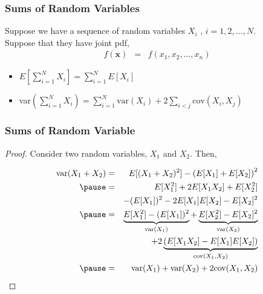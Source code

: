 \documentclass{beamer}
\numberwithin{equation}{section}
\begin{document}
\begin{frame}
\frametitle{Sums of Random Variables}

Suppose we have a sequence of random variables $X_{i}$ , $i = 1, 2, \hdots, N$.  \\

Suppose that they have joint pdf, 
\begin{eqnarray}
f(\boldsymbol{x}) & = & f(x_{1}, x_{2}, \hdots, x_{n}) \nonumber 
\end{eqnarray}

\begin{itemize}
\item[1)] $E[\sum_{i=1}^{N}X_{i} ]  = \sum_{i=1}^{N} E[X_{i}] $
\item[2)] var$(\sum_{i=1}^{N} X_{i} )   = \sum_{i=1}^{N} \text{var}(X_{i} )  + 2 \sum_{i<j} \text{cov}(X_{i}, X_{j}) $ 
\end{itemize}



\end{frame}


\begin{frame}
\frametitle{Sums of Random Variable}

\begin{proof}
Consider two random variables, $X_{1}$ and $X_{2}$.  Then, 

\pause 
\begin{eqnarray}
\text{var}(X_{1} + X_{2} ) & = & E[(X_{1} + X_{2})^2] - \left(E[X_{1}] + E[X_{2}] \right)^2 \nonumber \\  \pause 
& = & E[X_{1}^2]  + 2 E[X_{1}X_{2}]  + E[X_{2}^2]  \nonumber \\
&& - (E[X_{1}])^2 - 2 E[X_{1}] E[X_{2}]  -  E[X_{2}]^2 \nonumber \\ \pause 
& = & \underbrace{E[X_{1}^2] - (E[X_{1}])^2}_{\text{var}(X_{1}) }   + \underbrace{E[X_{2}^2] - E[X_{2}]^{2}}_{\text{var}(X_{2})} \nonumber \\ 
&&  + 2 \underbrace{(E[X_{1} X_{2} ]  - E[X_{1}] E[X_{2} ] )}_{\text{cov}(X_{1}, X_{2} ) }  \nonumber \\ \pause 
& = & \text{var}(X_{1} ) + \text{var}(X_{2} ) + 2 \text{cov}(X_{1}, X_{2}) \nonumber  
\end{eqnarray}

\end{proof}

\end{frame}
\end{document}
